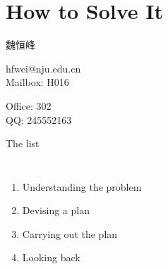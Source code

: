 \section{How to Solve It}

\begin{frame}
  \begin{center}
    魏恒峰

    hfwei@nju.edu.cn \\[10pt]

    Mailbox: H016

    Office: 302  \\[10pt]

    QQ: 245552163
  \end{center}
\end{frame}

\begin{frame}{The list}
  \begin{columns}
      \begin{enumerate}
	\item Understanding the problem
	\item Devising a plan
	\item Carrying out the plan
	\item Looking back
      \end{enumerate}
  \end{columns}

  \vspace{1.00cm}
\end{frame}
